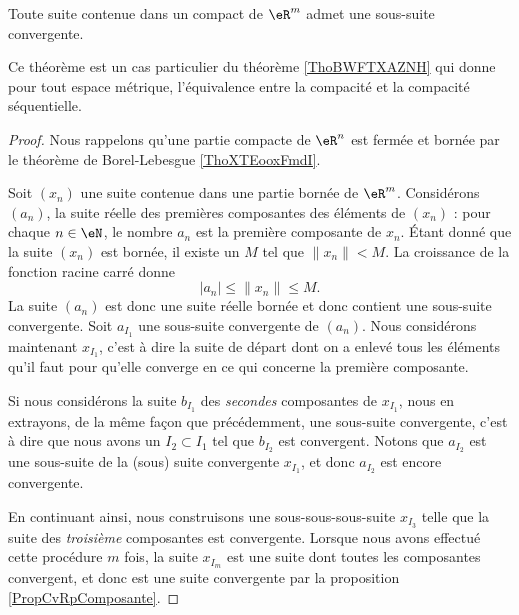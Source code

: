 \begin{theorem}		\label{ThoBolzanoWeierstrassRn}%
	Toute suite contenue dans un compact de \( \eR^m\) admet une sous-suite convergente.
\end{theorem}
Ce théorème est un cas particulier du théorème \ref{ThoBWFTXAZNH} qui donne pour tout espace métrique, l'équivalence entre la compacité et la compacité séquentielle.

\begin{proof}
    Nous rappelons qu'une partie compacte de \( \eR^n\) est fermée et bornée par le théorème de Borel-Lebesgue \ref{ThoXTEooxFmdI}.

    Soit $(x_n)$ une suite contenue dans une partie bornée de $\eR^m$. Considérons $(a_n)$, la suite réelle des premières composantes des éléments de $(x_n)$ : pour chaque $n\in\eN$, le nombre $a_n$ est la première composante de $x_n$. Étant donné que la suite $(x_n)$ est bornée, il existe un $M$ tel que $\| x_n \|<M$. La croissance de la fonction racine carré donne
	\begin{equation}
        | a_n |\leq\| x_n \|\leq M.
	\end{equation}
	La suite $(a_n)$ est donc une suite réelle bornée et donc contient une sous-suite convergente. Soit $a_{I_1}$ une sous-suite convergente de $(a_n)$. Nous considérons maintenant $x_{I_1}$, c'est à dire la suite de départ dont on a enlevé tous les éléments qu'il faut pour qu'elle converge en ce qui concerne la première composante.

	Si nous considérons la suite $b_{I_1}$ des \emph{secondes} composantes de $x_{I_1}$, nous en extrayons, de la même façon que précédemment, une sous-suite convergente, c'est à dire que nous avons un $I_2\subset I_1$ tel que $b_{I_2}$ est convergent. Notons que $a_{I_2}$ est une sous-suite de la (sous) suite convergente $x_{I_1}$, et donc $a_{I_2}$ est encore convergente.

	En continuant ainsi, nous construisons une sous-sous-sous-suite $x_{I_3}$ telle que la suite des \emph{troisième} composantes est convergente. Lorsque nous avons effectué cette procédure $m$ fois, la suite $x_{I_m}$ est une suite dont toutes les composantes convergent, et donc est une suite convergente par la proposition \ref{PropCvRpComposante}.
	

\end{proof}

